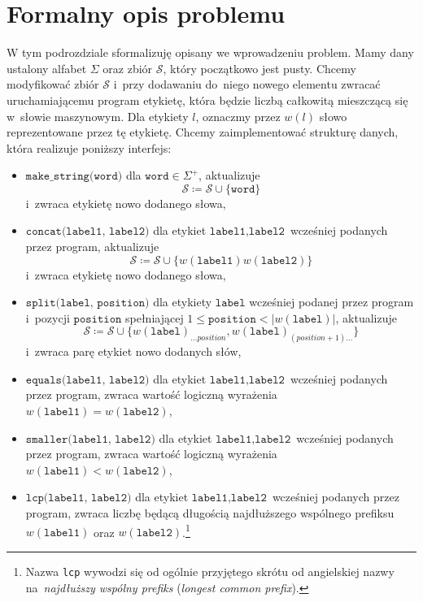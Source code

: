 \documentclass[declaration,shortabstract]{iithesis}
\theoremstyle{definition} \newtheorem{definition}{Definicja}[chapter]
\theoremstyle{remark} \newtheorem{remark}[definition]{Obserwacja}
\theoremstyle{plain} \newtheorem{theorem}[definition]{Twierdzenie}
\theoremstyle{remark} \newtheorem{example}{Przykład}[definition]
\theoremstyle{plain} \newtheorem{lemma}[definition]{Lemat}
\begin{document}
\section{Formalny opis problemu}

W tym podrozdziale sformalizuję opisany we wprowadzeniu problem. Mamy dany ustalony alfabet $\Sigma$ oraz zbiór $\mathcal{S}$, który początkowo jest pusty. Chcemy modyfikować zbiór $\mathcal{S}$ i~przy dodawaniu do~niego nowego elementu zwracać uruchamiającemu program etykietę, która będzie liczbą całkowitą mieszczącą się w~słowie maszynowym. Dla etykiety $l$, oznaczmy przez $w(l)$ słowo reprezentowane przez tę etykietę. Chcemy zaimplementować strukturę danych, która realizuje poniższy interfejs:
\begin{itemize}
    \item $\texttt{make\_string(word)}$ dla $\texttt{word} \in \Sigma^+$, aktualizuje $$\mathcal{S} \coloneqq \mathcal{S} \cup \{\texttt{word}\}$$ i~zwraca etykietę nowo dodanego słowa,
    \item $\texttt{concat(label1, label2)}$ dla etykiet $\texttt{label1}, \texttt{label2}$ wcześniej podanych przez program, aktualizuje $$\mathcal{S} \coloneqq \mathcal{S} \cup \{w(\texttt{label1})w(\texttt{label2})\}$$ i~zwraca etykietę nowo dodanego słowa,
    \item $\texttt{split(label, position)}$ dla etykiety $\texttt{label}$ wcześniej podanej przez program i~pozycji $\texttt{position}$ spełniającej $1 \leq \texttt{position} < |w(\texttt{label})|$, aktualizuje $$\mathcal{S} \coloneqq \mathcal{S} \cup \{w(\texttt{label})_{\ldots position}, w(\texttt{label})_{(position+1) \ldots}\}$$ i~zwraca parę etykiet nowo dodanych słów,
    \item $\texttt{equals(label1, label2)}$ dla etykiet $\texttt{label1}, \texttt{label2}$ wcześniej podanych przez program, zwraca wartość logiczną wyrażenia $w(\texttt{label1}) = w(\texttt{label2})$,
    \item $\texttt{smaller(label1, label2)}$ dla etykiet $\texttt{label1}, \texttt{label2}$ wcześniej podanych przez program, zwraca wartość logiczną wyrażenia $w(\texttt{label1}) < w(\texttt{label2})$,
    \item $\texttt{lcp(label1, label2)}$ dla etykiet $\texttt{label1}, \texttt{label2}$ wcześniej podanych przez program, zwraca liczbę będącą długością najdłuższego wspólnego prefiksu $w(\texttt{label1})$ oraz $w(\texttt{label2})$.\footnote{Nazwa \texttt{lcp} wywodzi się od ogólnie przyjętego skrótu od angielskiej nazwy na~\textit{najdłuższy wspólny prefiks} (\textit{longest common prefix}).}
\end{itemize}
\end{document}
